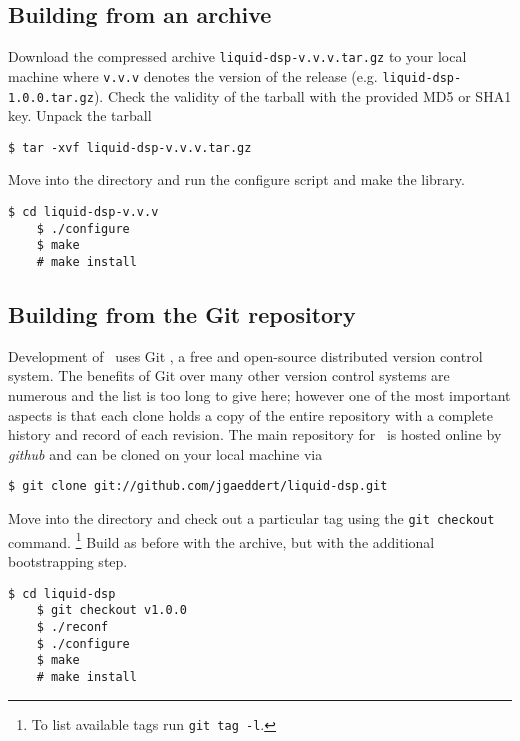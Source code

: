 \subsection{Building from an archive}
\label{section:installation:build_from_tarball}
Download the compressed archive {\tt liquid-dsp-v.v.v.tar.gz} to your
local machine where {\tt v.v.v} denotes the version of the release
(e.g. {\tt liquid-dsp-1.0.0.tar.gz}).
Check the validity of the tarball with the provided MD5 or SHA1 key.
%
%
%
%
Unpack the tarball
%
\begin{Verbatim}[fontsize=\small]
    $ tar -xvf liquid-dsp-v.v.v.tar.gz
\end{Verbatim}
%
Move into the directory and run the configure script and make the
library.
%
\begin{Verbatim}[fontsize=\small]
    $ cd liquid-dsp-v.v.v
    $ ./configure
    $ make
    # make install
\end{Verbatim}

\subsection{Building from the Git repository}
\label{section:installation:build_from_git}
Development of \liquid\ uses Git \cite{git:web}, a free and
open-source distributed version control system.
The benefits of Git over many other version control systems are
numerous and the list is too long to give here;
however one of the most important aspects is that each clone holds a
copy of the entire repository with a complete history and record of each
revision.
The main repository for \liquid\ is hosted online by {\em github}
\cite{github:web} and can be cloned on your local machine via
%
\begin{Verbatim}[fontsize=\small]
    $ git clone git://github.com/jgaeddert/liquid-dsp.git
\end{Verbatim}
%
Move into the directory and check out a particular tag using the
{\tt git checkout} command.%
\footnote{To list available tags run {\tt git tag -l}.}
Build as before with the archive, but with the additional bootstrapping
step.
%
\begin{Verbatim}[fontsize=\small]
    $ cd liquid-dsp
    $ git checkout v1.0.0
    $ ./reconf
    $ ./configure
    $ make
    # make install
\end{Verbatim}
%


